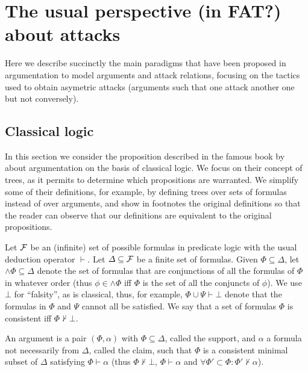 \documentclass[version=3.21, pagesize, twoside=off, bibliography=totoc, DIV=calc, fontsize=12pt, a4paper, french, english]{scrartcl}
\begin{document}
\section{The usual perspective (in FAT?) about attacks}
Here we describe succinctly the main paradigms that have been proposed in argumentation to model arguments and attack relations, focusing on the tactics used to obtain asymetric attacks (arguments such that one attack another one but not conversely).

\subsection{Classical logic}
In this section we consider the proposition described in the famous book by \citet{besnard_elements_2000} about argumentation on the basis of classical logic. We focus on their concept of trees, as it permits to determine which propositions are warranted. We simplify some of their definitions, for example, by defining trees over sets of formulas instead of over arguments, and show in footnotes the original definitions so that the reader can observe that our definitions are equivalent to the original propositions.

Let $\mathcal{F}$ be an (infinite) set of possible formulas in predicate logic with the usual deduction operator $⊢$. Let $\Delta \subseteq \mathcal{F}$ be a finite set of formulas.
Given $\Phi \subseteq \Delta$, let ${\land}\Phi \subseteq \Delta$ denote the set of formulas that are conjunctions of all the formulas of $\Phi$ in whatever order (thus $\phi \in {\land}\Phi$ iff $\Phi$ is the set of all the conjuncts of $\phi$).
We use $⊥$ for “falsity”, as is classical, thus, for example, $\Phi \cup \Psi ⊢ ⊥$ denote that the formulas in $\Phi$ and $\Psi$ cannot all be satisfied. We say that a set of formulas $\Phi$ is consistent iff $\Phi ⊬ ⊥$.

An argument is a pair $(\Phi, \alpha)$ with $\Phi \subseteq \Delta$, called the support, and $\alpha$ a formula not necessarily from $\Delta$, called the claim, such that $\Phi$ is a consistent minimal subset of $\Delta$ satisfying $\Phi ⊢ \alpha$ (thus $\Phi ⊬ ⊥$, $\Phi ⊢ \alpha$ and $\forall \Phi' \subset \Phi: \Phi' ⊬ \alpha$).
\end{document}
